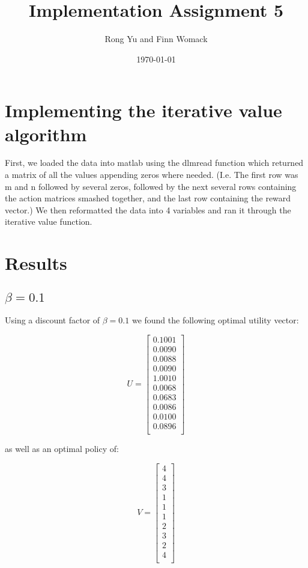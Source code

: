 \documentclass{article}
\title{Implementation Assignment 5}
\date{\today}
\author{Rong Yu and Finn Womack}
\begin{document}
	\maketitle
	\section{Implementing the iterative value algorithm}

	First, we loaded the data into matlab using the dlmread function which returned a matrix of all the values appending zeros where needed. (I.e. The first row was m and n followed by several zeros, followed by the next several rows containing the action matrices smashed together, and the last row containing the reward vector.) We then reformatted the data into 4 variables and ran it through the iterative value function.
	
	\section{Results}
	\subsection{$\beta = 0.1$}
	
	Using a discount factor of $\beta = 0.1$ we found the following optimal utility vector:
	
	\begin{equation}
	U
	=
	\begin{bmatrix}
    0.1001\\
	0.0090\\
	0.0088\\
	0.0090\\
	1.0010\\
	0.0068\\
	0.0683\\
	0.0086\\
	0.0100\\
	0.0896\\
	\end{bmatrix}
	\end{equation}
	
	as well as an optimal policy of:
	
	\begin{equation}
	V
	=
	\begin{bmatrix}
	4\\
	4\\
	3\\
	1\\
	1\\
	1\\
	2\\
	3\\
	2\\
	4\\
	\end{bmatrix}
	\end{equation}
	
\end{document}

